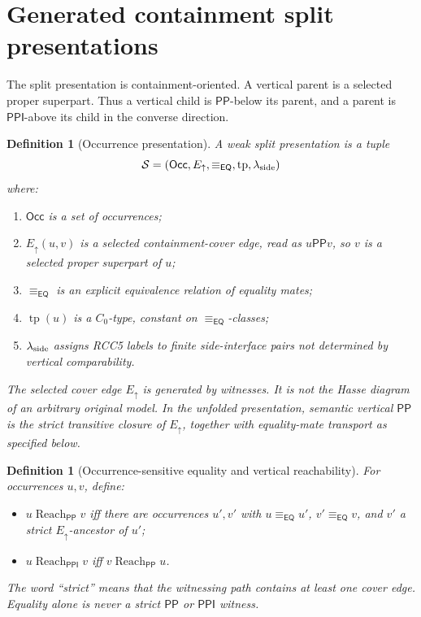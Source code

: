\documentclass[11pt]{article}
\newtheorem{definition}[theorem]{Definition}
\newcommand{\EQ}{\mathsf{EQ}}
\newcommand{\PP}{\mathsf{PP}}
\newcommand{\PPI}{\mathsf{PPI}}
\newcommand{\Occ}{\mathsf{Occ}}
\newcommand{\typ}{\operatorname{tp}}
\newcommand{\eqc}{\equiv_{\EQ}}
\newcommand{\reach}{\operatorname{Reach}}
\begin{document}
\section{Generated containment split presentations}

The split presentation is containment-oriented.  A vertical parent is a selected proper superpart.  Thus a vertical child is \(\PP\)-below its parent, and a parent is \(\PPI\)-above its child in the converse direction.

\begin{definition}[Occurrence presentation]
A weak split presentation is a tuple
\[
  \mathcal S=(\Occ,E_\uparrow,\eqc,\typ,\lambda_{\rm side})
\]
where:
\begin{enumerate}[label=(S\arabic*)]
\item \(\Occ\) is a set of occurrences;
\item \(E_\uparrow(u,v)\) is a selected containment-cover edge, read as \(u\PP v\), so \(v\) is a selected proper superpart of \(u\);
\item \(\eqc\) is an explicit equivalence relation of equality mates;
\item \(\typ(u)\) is a \(C_0\)-type, constant on \(\eqc\)-classes;
\item \(\lambda_{\rm side}\) assigns RCC5 labels to finite side-interface pairs not determined by vertical comparability.
\end{enumerate}
The selected cover edge \(E_\uparrow\) is generated by witnesses.  It is not the Hasse diagram of an arbitrary original model.  In the unfolded presentation, semantic vertical \(\PP\) is the strict transitive closure of \(E_\uparrow\), together with equality-mate transport as specified below.
\end{definition}

\begin{definition}[Occurrence-sensitive equality and vertical reachability]\label{def:eq-aware-reach}
For occurrences \(u,v\), define:
\begin{itemize}
\item \(u\reach_\PP v\) iff there are occurrences \(u',v'\) with \(u\eqc u'\), \(v'\eqc v\), and \(v'\) a strict \(E_\uparrow\)-ancestor of \(u'\);
\item \(u\reach_\PPI v\) iff \(v\reach_\PP u\).
\end{itemize}
The word ``strict'' means that the witnessing path contains at least one cover edge.  Equality alone is never a strict \(\PP\) or \(\PPI\) witness.
\end{definition}
\end{document}
